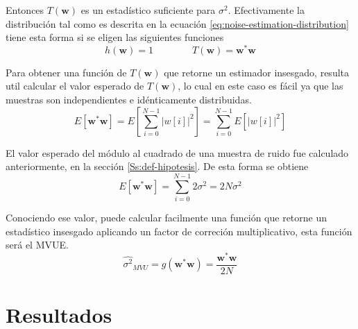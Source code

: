 Entonces $T(\mathbf{w})$ es un estadístico suficiente para $\sigma^2$. Efectivamente la distribución tal como es descrita en la ecuación \ref{eq:noise-estimation-distribution} tiene esta forma si se eligen las siguientes funciones
\begin{equation}
    h(\mathbf{w}) = 1 \qquad\qquad T(\mathbf{w}) = \mathbf{w}^\ast \mathbf{w}
\end{equation}

Para obtener una función de $T(\mathbf{w})$ que retorne un estimador insesgado, resulta util calcular el valor esperado de $T(\mathbf{w})$, lo cual en este caso es fácil ya que las muestras son independientes e idénticamente distribuidas. 
\begin{equation}
    E\left[\mathbf{w}^\ast\mathbf{w}\right] =  E\left[\sum_{i=0}^{N-1}\lvert w[i]\rvert^2\right]  =   \sum_{i=0}^{N-1}E\left[\lvert w[i]\rvert^2\right] 
\end{equation}

El valor esperado del módulo al cuadrado de una muestra de ruido fue calculado anteriormente, en la sección \ref{Ss:def-hipotesis}. De esta forma se obtiene 
\begin{equation}
    E\left[\mathbf{w}^\ast\mathbf{w}\right] =  \sum_{i=0}^{N-1}2\sigma^2 = 2N\sigma^2 
\end{equation}

Conociendo ese valor, puede calcular facilmente una función que retorne un estadístico insesgado aplicando un factor de correción multiplicativo, esta función será el MVUE.
\begin{equation}
    \widehat{\sigma^2}_{MVU} = g\left(\mathbf{w}^\ast\mathbf{w}\right) =  \frac{\mathbf{w}^\ast\mathbf{w}}{2N}
\end{equation}



\section{Resultados}
\label{S:deteccion-resultados}



